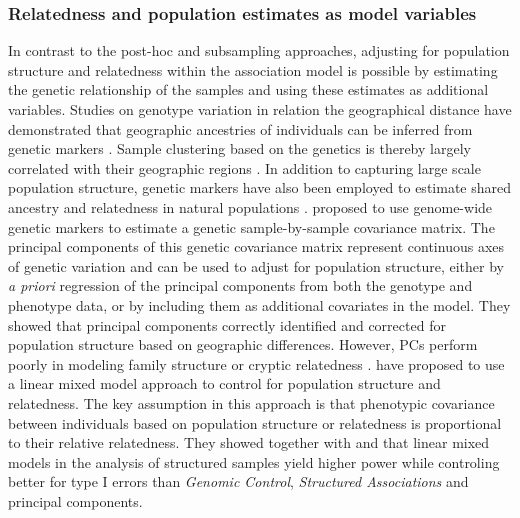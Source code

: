 \subsubsection{Relatedness and population estimates as model variables}
\label{subsubsection:relatedness-model-variables}
In contrast to the post-hoc and subsampling approaches, adjusting for population structure and relatedness within the association model is possible by estimating the genetic relationship of the samples and using these estimates as additional variables. Studies on genotype variation in relation the geographical distance have demonstrated that geographic ancestries of individuals can be inferred from genetic markers \citep{Rosenberg2002,Tang2005}. Sample clustering based on the genetics is thereby largely correlated with their geographic regions \citep{Rosenberg2005}. In addition to capturing large scale population structure, genetic markers have also been employed to estimate shared ancestry and relatedness in natural populations \citep{Lynch1999,Ritland2000,Thomas2005}. \citet{Price2006} proposed to use genome-wide genetic markers to estimate a genetic sample-by-sample covariance matrix. The principal components of this genetic covariance matrix represent continuous axes of genetic variation and can be used to adjust for population structure, either by \textit{a priori} regression of the principal components from both the genotype and phenotype data, or by including them as additional covariates in the model. They showed that principal components correctly identified and corrected for population structure based on geographic differences. However, PCs perform poorly in modeling family structure or cryptic relatedness  \citep{Yu2006,Zhao2007,Kang2010,Casale2015}. \citet{Yu2006} have proposed to use a linear mixed model approach to control for population structure and relatedness. The key assumption in this approach is that phenotypic covariance between individuals based on population structure or relatedness is proportional to their relative relatedness. They showed together with \citet{Malosetti2007} and \citet{Zhao2007} that linear mixed models in the analysis of structured samples yield higher power while controling better for type I errors than \textit{Genomic Control}, \textit{Structured Associations} and principal components.

